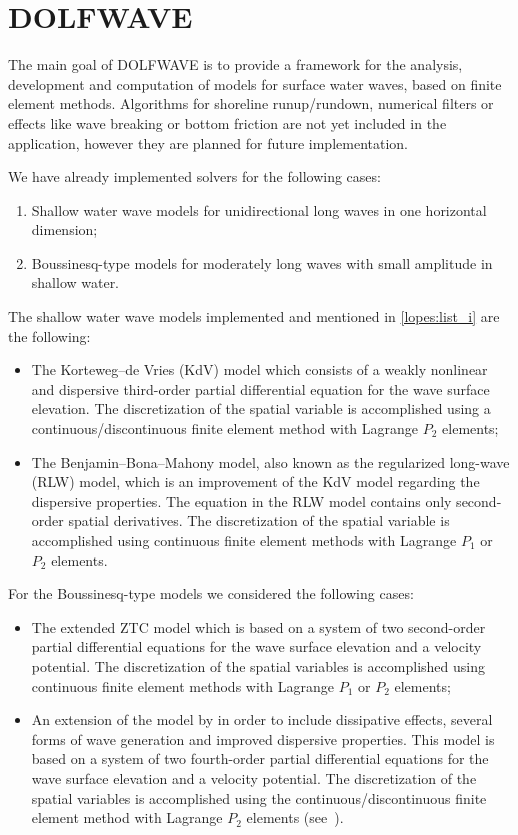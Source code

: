 \section{DOLFWAVE}
\label{sec:lopes:dolfwave}

The main goal of DOLFWAVE is to provide a framework for the analysis,
development and computation of models for surface water waves, based
on finite element methods. Algorithms for shoreline runup/rundown,
numerical filters or effects like wave breaking or bottom friction are
not yet included in the application, however they are planned for
future implementation.

We have already implemented solvers for the following cases:
\begin{enumerate}
\item \label{lopes:list_i} Shallow water wave models for
  unidirectional long waves in one horizontal dimension;
\item  Boussinesq-type models for moderately long
  waves with small amplitude in shallow water.
\end{enumerate}
The shallow water wave models implemented and mentioned in
\ref{lopes:list_i} are the following:
\begin{itemize}
\item The Korteweg--de Vries (KdV) model which consists of a weakly
  nonlinear and dispersive third-order partial differential equation
  for the wave surface elevation. The discretization of the spatial
  variable is accomplished using a continuous/discontinuous finite
  element method with Lagrange $P_2$ elements;
\item The Benjamin--Bona--Mahony model, also known as the regularized
  long-wave (RLW) model, which is an improvement of the KdV model
  regarding the dispersive properties.  The equation in the RLW model
  contains only second-order spatial derivatives. The discretization
  of the spatial variable is accomplished using continuous finite
  element methods with Lagrange $P_1$ or $P_2$ elements.
\end{itemize}
For the Boussinesq-type models we considered the following
cases:
\begin{itemize}
\item The extended ZTC model which is based on a system of two
  second-order partial differential equations for the wave surface
  elevation and a velocity potential. The discretization of the
  spatial variables is accomplished using continuous finite element
  methods with Lagrange $P_1$ or $P_2$ elements;
 \item An extension of the model by \citet{ChenLiu1994} in order to
   include dissipative effects, several forms of wave generation and
   improved dispersive properties. This model is based on a system of
   two fourth-order partial differential equations for the wave
   surface elevation and a velocity potential. The discretization of
   the spatial variables is accomplished using the
   continuous/discontinuous finite element method with Lagrange $P_2$
   elements (see~\citet{LopesPereiraTrabucho}).
\end{itemize}

